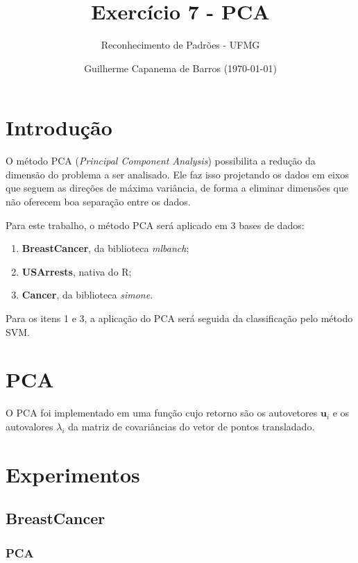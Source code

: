 \documentclass[a4paper]{article}
\title{Exercício 7 - PCA}
\author{Reconhecimento de Padrões - UFMG}
\date{\small{Guilherme Capanema de Barros (\today)}}
\begin{document}
\maketitle

\section{Introdução}

O método PCA (\textit{Principal Component Analysis}) possibilita a redução da dimensão do problema a ser analisado. Ele faz isso projetando os dados em eixos que seguem as direções de máxima variância, de forma a eliminar dimensões que não oferecem boa separação entre os dados.

Para este trabalho, o método PCA será aplicado em 3 bases de dados: 

\begin{enumerate}
	\item \textbf{BreastCancer}, da biblioteca \textit{mlbanch};
	\item \textbf{USArrests}, nativa do R;
	\item \textbf{Cancer}, da biblioteca \textit{simone}.
\end{enumerate}

Para os itens 1 e 3, a aplicação do PCA será seguida da classificação pelo método SVM.

\section{PCA}

O PCA foi implementado em uma função cujo retorno são os autovetores $\textbf{u}_i$ e os autovalores $\lambda_i$ da matriz de covariâncias do vetor de pontos transladado.



\newpage
\section{Experimentos}

\subsection{BreastCancer}

\subsubsection{PCA}
\end{document}
